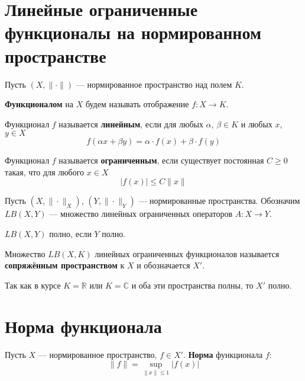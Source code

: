 \documentclass[12pt]{article}
\newtheorem{theorem}{\hskip\parindent Теорема}%
\newtheorem{definition}{\hskip\parindent Определение}%
\begin{document}
	\section{Линейные ограниченные функционалы на нормированном пространстве}
	Пусть $(X,\|\cdot\|)$ --- нормированное пространство над полем $K$.
	\begin{definition}
		\textbf{Функционалом} на $X$ будем называть отображение $f: X\to K$.
	\end{definition}
	\begin{definition}
		Функционал $f$ называется \textbf{линейным}, если для любых $\alpha$, $\beta\in K$ и любых $x$, $y\in X$
		\begin{equation*}
			f(\alpha x+\beta y)=\alpha\cdot f(x)+\beta\cdot f(y)
		\end{equation*}
	\end{definition}
	\begin{definition}
		Функционал $f$ называется \textbf{ограниченным}, если существует постоянная $C\geqslant0$ такая, что для любого $x\in X$
		\begin{equation*}
			|f(x)|\leqslant C\|x\|
		\end{equation*}
	\end{definition}

Пусть $(X,\|\cdot\|_X)$, $(Y,\|\cdot\|_Y)$ --- нормированные пространства. Обозначим $LB(X,Y)$ --- множество линейных ограниченных операторов $A:X\to Y$.
\begin{theorem}
	$LB(X,Y)$ полно, если $Y$ полно.
\end{theorem}

Множество $LB(X,K)$ линейных ограниченных функционалов называется \textbf{сопряжённым пространством} к $X$ и обозначается $X'$.

Так как в курсе $K=\mathbb{R}$ или $K=\mathbb{C}$ и оба эти пространства полны, то $X'$ полно.
	\section{Норма функционала}
	\begin{definition}
		Пусть $X$ --- нормированное пространство, $f\in X'$. \textbf{Норма} функционала $f$:
		\begin{equation*}
			\|f\|=\sup\limits_{\|x\|\leqslant1}|f(x)|
		\end{equation*}
	\end{definition}
\begin{theorem}
	
\end{theorem}
\end{document}
